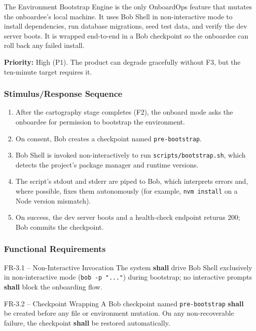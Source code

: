 \documentclass[11pt,letterpaper]{article}
\newcommand{\shall}{\textbf{shall}}
\begin{document}
The Environment Bootstrap Engine is the only OnboardOps feature that mutates the onboardee's local machine. It uses Bob Shell in non-interactive mode to install dependencies, run database migrations, seed test data, and verify the dev server boots. It is wrapped end-to-end in a Bob checkpoint so the onboardee can roll back any failed install.

\textbf{Priority:} High (P1). The product can degrade gracefully without F3, but the ten-minute target requires it.

\subsubsection{Stimulus/Response Sequence}

\begin{enumerate}
  \item After the cartography stage completes (F2), the onboard mode asks the onboardee for permission to bootstrap the environment.
  \item On consent, Bob creates a checkpoint named \texttt{pre-bootstrap}.
  \item Bob Shell is invoked non-interactively to run \texttt{scripts/bootstrap.sh}, which detects the project's package manager and runtime versions.
  \item The script's stdout and stderr are piped to Bob, which interprets errors and, where possible, fixes them autonomously (for example, \texttt{nvm install} on a Node version mismatch).
  \item On success, the dev server boots and a health-check endpoint returns 200; Bob commits the checkpoint.
\end{enumerate}

\subsubsection{Functional Requirements}

\begin{reqbox}{FR-3.1 -- Non-Interactive Invocation}
The system \shall{} drive Bob Shell exclusively in non-interactive mode (\texttt{bob -p "..."}) during bootstrap; no interactive prompts \shall{} block the onboarding flow.
\end{reqbox}

\begin{reqbox}{FR-3.2 -- Checkpoint Wrapping}
A Bob checkpoint named \texttt{pre-bootstrap} \shall{} be created before any file or environment mutation. On any non-recoverable failure, the checkpoint \shall{} be restored automatically.
\end{reqbox}
\end{document}
